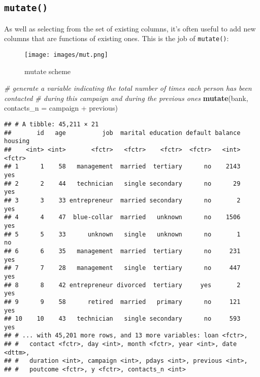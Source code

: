 \documentclass[]{book}
\newenvironment{Shaded}{\begin{snugshade}}{\end{snugshade}}
\newcommand{\KeywordTok}[1]{\textcolor[rgb]{0.13,0.29,0.53}{\textbf{{#1}}}}
\newcommand{\DataTypeTok}[1]{\textcolor[rgb]{0.13,0.29,0.53}{{#1}}}
\newcommand{\StringTok}[1]{\textcolor[rgb]{0.31,0.60,0.02}{{#1}}}
\newcommand{\CommentTok}[1]{\textcolor[rgb]{0.56,0.35,0.01}{\textit{{#1}}}}
\newcommand{\NormalTok}[1]{{#1}}
\begin{document}
\clearpage

\subsection{\texorpdfstring{\texttt{mutate()}}{mutate()}}\label{mutate}

As well as selecting from the set of existing columns, it's often useful
to add new columns that are functions of existing ones. This is the job
of \texttt{mutate()}:

\begin{figure}[htbp]
\centering
\texttt{[image: images/mut.png]}
\caption{mutate scheme}
\end{figure}

\begin{Shaded}
\begin{Highlighting}[]
\CommentTok{# generate a variable indicating the total number of times each person has been contacted }
\CommentTok{# during this campaign and during the previous ones }
\KeywordTok{mutate}\NormalTok{(bank, }\DataTypeTok{contacts_n =} \NormalTok{campaign +}\StringTok{ }\NormalTok{previous)}
\end{Highlighting}
\end{Shaded}

\begin{verbatim}
## # A tibble: 45,211 × 21
##       id   age          job  marital education default balance housing
##    <int> <int>       <fctr>   <fctr>    <fctr>  <fctr>   <int>  <fctr>
## 1      1    58   management  married  tertiary      no    2143     yes
## 2      2    44   technician   single secondary      no      29     yes
## 3      3    33 entrepreneur  married secondary      no       2     yes
## 4      4    47  blue-collar  married   unknown      no    1506     yes
## 5      5    33      unknown   single   unknown      no       1      no
## 6      6    35   management  married  tertiary      no     231     yes
## 7      7    28   management   single  tertiary      no     447     yes
## 8      8    42 entrepreneur divorced  tertiary     yes       2     yes
## 9      9    58      retired  married   primary      no     121     yes
## 10    10    43   technician   single secondary      no     593     yes
## # ... with 45,201 more rows, and 13 more variables: loan <fctr>,
## #   contact <fctr>, day <int>, month <fctr>, year <int>, date <dttm>,
## #   duration <int>, campaign <int>, pdays <int>, previous <int>,
## #   poutcome <fctr>, y <fctr>, contacts_n <int>
\end{verbatim}
\end{document}
